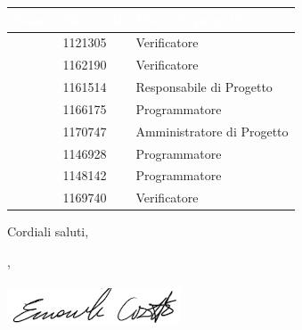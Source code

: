 \documentclass[12pt]{letter}
\begin{document}
\begin{letter}
{\begin{longtable}{ C{4cm} C{3cm} C{6cm} }
                \textcolor{white}{\textbf{Nome}} & \textcolor{white}{\textbf{Matricola}} & \textcolor{white}{\textbf{Ruolo di progetto}}\\
                \endhead 
                \MC{} & 1121305 & Verificatore \\
                \LD{} & 1162190 & Verificatore \\
                \CE{} & 1161514 & Responsabile di Progetto \\
                \SE{} & 1166175 & Programmatore \\
                \PF{} & 1170747 & Amministratore di Progetto \\
                \DF{} & 1146928 & Programmatore \\
                \BR{} & 1148142 & Programmatore \\
                \AT{} & 1169740 & Verificatore \\  
            \end{longtable}
        }
        Cordiali saluti,
        \closing{\CE{}, \\ \textit{\Responsabile{}}\\ \includegraphics[width=.6\linewidth]{../DocumentazioneEsterna/PianoDiProgetto/Sezioni/Immagini/Firme/Emanuele.png}}
        \vspace{10mm}
    \end{letter}
\end{document}
